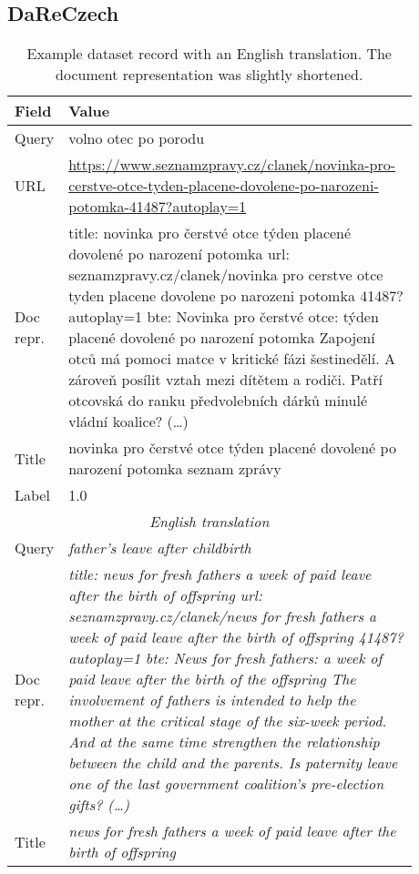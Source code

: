 \documentclass[letterpaper]{article} \usepackage{aaai22 }  \usepackage{times}  \usepackage{helvet}  \usepackage{courier}  \usepackage[hyphens]{url}  \usepackage{graphicx} \usepackage{amsmath,amsfonts,amssymb, mathabx,bm,bbm}
\begin{document}
\subsection{DaReCzech}
\begin{table*}[t!]
    \centering\footnotesize
    \begin{tabular}{lp{0.88\linewidth}}\toprule
    Field & Value\\
    
    \midrule
Query & volno otec po porodu\\[0.3cm]
URL & \url{https://www.seznamzpravy.cz/clanek/novinka-pro-cerstve-otce-tyden-placene-dovolene-po-narozeni-potomka-41487?autoplay=1}\\[0.3cm]
    Doc repr. & title: novinka pro čerstvé otce týden placené dovolené po narození potomka url: seznamzpravy.cz/clanek/novinka pro cerstve otce tyden placene dovolene po narozeni potomka 41487?autoplay=1 bte: Novinka pro čerstvé otce: týden placené dovolené po narození potomka Zapojení otců má pomoci matce v kritické fázi šestinedělí. A zároveň posílit vztah mezi dítětem a rodiči. Patří otcovská do ranku předvolebních dárků minulé vládní koalice? (\ldots)\\[0.3cm] Title & novinka pro čerstvé otce týden placené dovolené po narození potomka seznam zprávy\\[0.3cm]
    Label & 1.0\\
    \midrule
    \multicolumn{2}{c}{\textit{English translation}} \\ \midrule
    Query & \textit{father's leave after childbirth} \\[0.3cm]
    
    Doc repr. & \textit{title: news for fresh fathers a week of paid leave after the birth of offspring url: seznamzpravy.cz/clanek/news for fresh fathers a week of paid leave after the birth of offspring 41487?autoplay=1 bte: News for fresh fathers: a week of paid leave after the birth of the offspring The involvement of fathers is intended to help the mother at the critical stage of the six-week period. And at the same time strengthen the relationship between the child and the parents. Is paternity leave one of the last government coalition's pre-election gifts? (\ldots)} \\[0.3cm]  

    Title & \textit{news for fresh fathers a week of paid leave after the birth of offspring} \\
    \bottomrule
    \end{tabular}
    \caption{Example dataset record with an English translation. The document representation was slightly shortened.}
    \label{table:dataset_example}
\end{table*}
\end{document}
